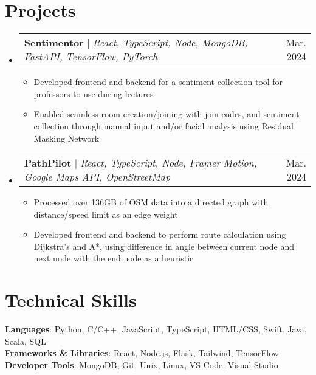 \documentclass[letterpaper,12pt]{article}
\makeatletter
\newcommand{\resumeItem}[1]{
  \item\small{
    {#1 \vspace{-2pt}}
  }
}
\newcommand{\resumeProjectHeading}[2]{
    \item
    \begin{tabular*}{0.97\textwidth}{l@{\extracolsep{\fill}}r}
      \small#1 & #2 \\
    \end{tabular*}\vspace{-7pt}
}
\newcommand{\resumeSubHeadingListStart}{\begin{itemize}[leftmargin=0.15in, label={}]}
\newcommand{\resumeSubHeadingListEnd}{\end{itemize}}
\newcommand{\resumeItemListStart}{\begin{itemize}}
\newcommand{\resumeItemListEnd}{\end{itemize}\vspace{-5pt}}
\makeatother
\begin{document}
\section{Projects}
    \resumeSubHeadingListStart
      \resumeProjectHeading
          {\textbf{Sentimentor} $|$ \emph{React, TypeScript, Node, MongoDB, FastAPI, TensorFlow, PyTorch}}{Mar. 2024}
          \resumeItemListStart
            \resumeItem{Developed frontend and backend for a sentiment collection tool for professors to use during lectures}
            \resumeItem{Enabled seamless room creation/joining with join codes, and sentiment collection through manual input and/or facial analysis using Residual Masking Network}
          \resumeItemListEnd
      \resumeProjectHeading
          {\textbf{PathPilot} $|$ \emph{React, TypeScript, Node, Framer Motion, Google Maps API, OpenStreetMap}}{Mar. 2024}
          \resumeItemListStart
            \resumeItem{Processed over 136GB of OSM data into a directed graph with distance/speed limit as an edge weight}
            \resumeItem{Developed frontend and backend to perform route calculation using Dijkstra’s and A*, using difference in angle between current node and next node with the end node as a heuristic}
          \resumeItemListEnd
    \resumeSubHeadingListEnd


\section{Technical Skills}
 \begin{itemize}[leftmargin=0.15in, label={}]
    \small{\item{
     \textbf{Languages}{: Python, C/C++, JavaScript, TypeScript, HTML/CSS, Swift, Java, Scala, SQL} \\
     \textbf{Frameworks \& Libraries}{: React, Node.js, Flask, Tailwind, TensorFlow} \\
     \textbf{Developer Tools}{: MongoDB, Git, Unix, Linux, VS Code, Visual Studio} \\
    }}
 \end{itemize}
\end{document}
